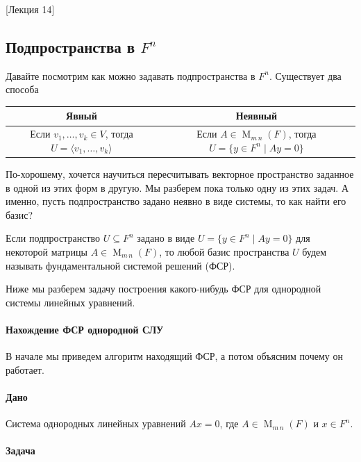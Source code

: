 [Лекция 14]


\subsection{Подпространства в $F^n$}
\label{section::Subspaces}

Давайте посмотрим как можно задавать подпространства в $F^n$.
Существует два способа
\begin{center}
\renewcommand{\arraystretch}{1.5}
\begin{tabular}{c|c}
{\bf Явный}&{\bf Неявный}\\
\hline
{Если $v_1,\ldots,v_k\in V$, тогда $U = \langle v_1,\ldots, v_k \rangle$}&{Если $A\in \operatorname{M}_{m\,n}(F)$, тогда $U = \{y\in F^n \mid Ay = 0\}$}\\
\end{tabular}
\end{center}

По-хорошему, хочется научиться пересчитывать векторное пространство заданное в одной из этих форм в другую.
Мы разберем пока только одну из этих задач.
А именно, пусть подпространство задано неявно в виде системы, то как найти его базис?

\begin{definition}
\label{def::FSS}
Если подпространство $U\subseteq F^n$ задано в виде $U = \{y\in F^n\mid Ay = 0\}$ для некоторой матрицы $A\in\operatorname{M}_{m\,n}(F)$, то любой базис пространства $U$ будем называть фундаментальной системой решений (ФСР).
\end{definition}

Ниже мы разберем задачу построения какого-нибудь ФСР для однородной системы линейных уравнений.

\paragraph{Нахождение ФСР однородной СЛУ}

В начале мы приведем алгоритм находящий ФСР, а потом объясним почему он работает.

\paragraph{Дано}

Система однородных линейных уравнений $Ax = 0$, где $A\in \operatorname{M}_{m\,n}(F)$ и $x\in F^n$.

\paragraph{Задача}

